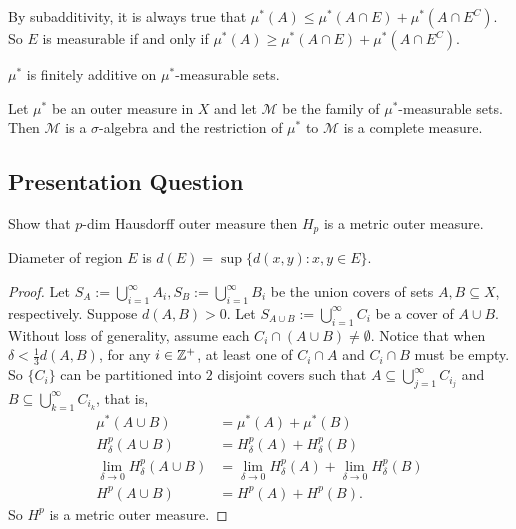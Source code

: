 \documentclass[class=book, crop=false]{standalone}
\begin{document}
        \begin{remark}
            By subadditivity, it is always true that $\mu^*(A) \leq \mu^*(A \cap E) + \mu^*(A \cap E^C)$. So $E$ is measurable if and only if $\mu^*(A) \geq \mu^*(A \cap E) + \mu^*(A \cap E^C)$.
        \end{remark}

        \begin{theorem}
            $\mu^*$ is finitely additive on $\mu^*$-measurable sets.
        \end{theorem}

        \begin{theorem}
            Let $\mu^*$ be an outer measure in $X$ and let $\mathscr{M}$ be the family of $\mu^*$-measurable sets. Then $\mathscr{M}$ is a $\sigma$-algebra and the restriction of $\mu^*$ to $\mathscr{M}$ is a complete measure.
        \end{theorem}
        
        \subsection{Presentation Question}
        \begin{question}
            Show that $p$-dim Hausdorff outer measure then $H_p$ is a metric outer measure.
        \end{question}
        
        \begin{definition}[Diameter]
            Diameter of region $E$ is $d(E) = \sup\{d(x, y) : x, y \in E\}$.
        \end{definition}

        \begin{proof}
            Let $S_A := \bigcup^{\infty}_{i = 1} A_i, S_B := \bigcup^{\infty}_{i = 1} B_i$ be the union covers of sets $A, B \subseteq X$, respectively. Suppose $d(A, B) > 0$. Let $S_{A \cup B} := \bigcup^{\infty}_{i = 1} C_i$ be a cover of $A \cup B$. Without loss of generality, assume each $C_i \cap (A \cup B) \neq \emptyset$. Notice that when $\delta < \frac{1}{3} d(A, B)$, for any $i \in \mathbb{Z}^+$, at least one of $C_i \cap A$ and $C_i \cap B$ must be empty. So $\{C_i\}$ can be partitioned into $2$ disjoint covers such that $A \subseteq \bigcup^{\infty}_{j = 1} C_{i_j}$ and $B \subseteq \bigcup^{\infty}_{k = 1} C_{i_k}$, that is,
            \begin{align*}
                \mu^*(A \cup B) &= \mu^*(A) + \mu^*(B) \\
                H^p_{\delta}(A \cup B) &= H^p_{\delta}(A) + H^p_{\delta}(B) \\
                \lim_{\delta \rightarrow 0} H^p_{\delta}(A \cup B) &= \lim_{\delta \rightarrow 0} H^p_{\delta}(A) + \lim_{\delta \rightarrow 0} H^p_{\delta}(B) \\
                H^p(A \cup B) &= H^p(A) + H^p(B).
            \end{align*}
            So $H^p$ is a metric outer measure.
        \end{proof}
\end{document}
